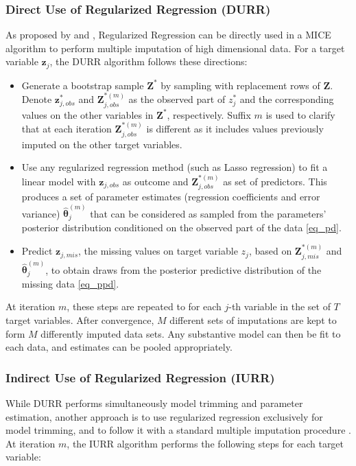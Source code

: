 \subsubsection{Direct Use of Regularized Regression (DURR)}

	As proposed by \cite{zhaoLong:2016} and \cite{dengEtAl:2016}, Regularized Regression can be directly used
	in a MICE algorithm to perform multiple imputation of high dimensional data. 
	For a target variable $\bm{z}_j$, the DURR algorithm follows these directions:

	\begin{itemize}

	\item Generate a bootstrap sample $\bm{Z^{*}}$ by sampling with replacement rows of $\bm{Z}$.
		Denote $\bm{z}_{j,obs}^{*}$ and $\bm{Z}_{j,obs}^{*(m)}$ as the observed part of $z_{j}^{*}$ and 
		the corresponding values on the other variables in $\bm{Z^{*}}$, respectively. Suffix $m$
		is used to clarify that at each iteration $\bm{Z}_{j,obs}^{*(m)}$ is different as it includes
		values previously imputed on the other target variables.

	\item Use any regularized regression method (such as Lasso regression) to fit a linear model with
		$\bm{z}_{j,obs}$ as outcome and $\bm{Z}_{j,obs}^{*(m)}$ as set of predictors. 
		This produces a set of parameter estimates (regression coefficients and error variance)
		$\hat{\bm{\theta}}_{j}^{(m)}$ that can be considered as sampled from the parameters' posterior 
		distribution conditioned on the observed part of the data \eqref{eq_pd}.

	\item Predict $\bm{z}_{j,mis}$, the missing values on target variable $z_{j}$, based on 
		$\bm{Z}_{j, mis}^{*(m)}$ and $\hat{\bm{\theta}}_{j}^{(m)}$, to obtain draws from the 
		posterior predictive distribution of the missing data \eqref{eq_ppd}.

	\end{itemize}

	At iteration $m$, these steps are repeated to for each $j$-th variable in the set of $T$ target 
	variables. After convergence, $M$ different sets of imputations are kept to form 
	$M$ differently imputed data sets. Any substantive model can then be fit to each data, and 
	estimates can be pooled appropriately.

\subsubsection{Indirect Use of Regularized Regression (IURR)}
	While DURR performs simultaneously model trimming and parameter estimation, another approach is to
	use regularized regression exclusively for model trimming, and to follow it with a standard multiple 
	imputation procedure \citep{zhaoLong:2016, dengEtAl:2016}. 
	At iteration $m$, the IURR algorithm performs the following steps for each
	target variable:

